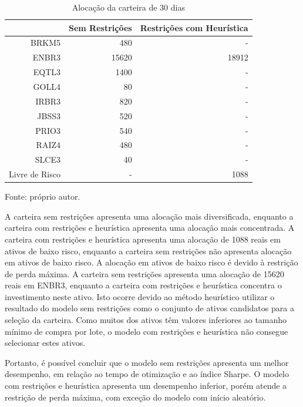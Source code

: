         \begin{table}[H]
            \centering
            \caption{Alocação da carteira de 30 dias}
            \label{tab:distribuicao_carteira_30}
            \begin{tabular}{rrr}
                \hline
                & Sem Restrições & Restrições com Heurística \\
                \hline\hline
               BRKM5 & 480 & - \\
               ENBR3 & 15620 & 18912 \\
               EQTL3 & 1400 & - \\
               GOLL4 & 80 & - \\
               IRBR3 & 820 & - \\
               JBSS3 & 520 & - \\
               PRIO3 & 540 & - \\
               RAIZ4 & 480 & - \\
               SLCE3 & 40 & - \\
               Livre de Risco & - & 1088 \\
               \hline
            \end{tabular}
            \par \footnotesize Fonte: próprio autor. 
        \end{table}

        \ipar A carteira sem restrições apresenta uma alocação mais diversificada, enquanto a carteira com restrições e heurística apresenta uma alocação mais concentrada. A carteira com restrições e heurística apresenta uma alocação de 1088 reais em ativos de baixo risco, enquanto a carteira sem restrições não apresenta alocação em ativos de baixo risco. A alocação em ativos de baixo risco é devido à restrição de perda máxima. A carteira sem restrições apresenta uma alocação de 15620 reais em ENBR3, enquanto a carteira com restrições e heurística concentra o investimento neste ativo. Isto ocorre devido ao método heurístico utilizar o resultado do modelo sem restrições como o conjunto de ativos candidatos para a seleção da carteira. Como muitos dos ativos têm valores inferiores ao tamanho mínimo de compra por lote, o modelo com restrições e heurística não consegue selecionar estes ativos.

        \ipar Portanto, é possível concluir que o modelo sem restrições apresenta um melhor desempenho, em relação ao tempo de otimização e ao índice Sharpe. O modelo com restrições e heurística apresenta um desempenho inferior, porém atende a restrição de perda máxima, com exceção do modelo com início aleatório.
        


